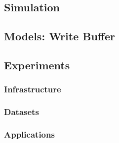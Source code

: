 \documentclass{IEEEtran}
\begin{document}





\subsection{Simulation} %

\subsection{Models: Write Buffer} %




\subsection{Experiments} %

\subsubsection{Infrastructure} %


\subsubsection{Datasets} %


\subsubsection{Applications} %
\end{document}
